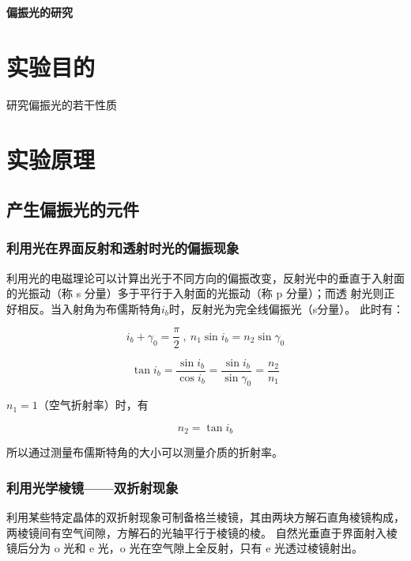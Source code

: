 \documentclass[a4paper,UTF8]{ctexart}
\begin{document}
\begin{center}
    \textbf{\Large 偏振光的研究}
    \par {}
\end{center}

\section{实验目的}
研究偏振光的若干性质
\section{实验原理}

\subsection{产生偏振光的元件}

\subsubsection{利用光在界面反射和透射时光的偏振现象}

利用光的电磁理论可以计算出光于不同方向的偏振改变，反射光中的垂直于入射面的光振动（称 s 分量）多于平行于入射面的光振动（称 p 分量）；而透
射光则正好相反。当入射角为布儒斯特角$i_b$时，反射光为完全线偏振光（s分量）。
此时有：

\begin{equation*}
    i_b+\gamma_0 = \frac{\pi}{2} \  , \ n_1 \sin{i_b} = n_2 \sin{\gamma_0} 
\end{equation*}

\begin{equation*}
    \tan{i_b} = \frac{\sin{i_b}}{\cos{i_b}} = \frac{\sin{i_b}}{\sin{\gamma_0}} = \frac{n_2}{n_1}
\end{equation*}

$n_1 = 1$（空气折射率）时，有

\begin{equation}
   n_2 = \tan{i_b} 
\end{equation}

所以通过测量布儒斯特角的大小可以测量介质的折射率。

\subsubsection{利用光学棱镜——双折射现象}

利用某些特定晶体的双折射现象可制备格兰棱镜，其由两块方解石直角棱镜构成，两棱镜间有空气间隙，方解石的光轴平行于棱镜的棱。
自然光垂直于界面射入棱镜后分为 o 光和 e 光，o 光在空气隙上全反射，只有 e 光透过棱镜射出。
\end{document}
